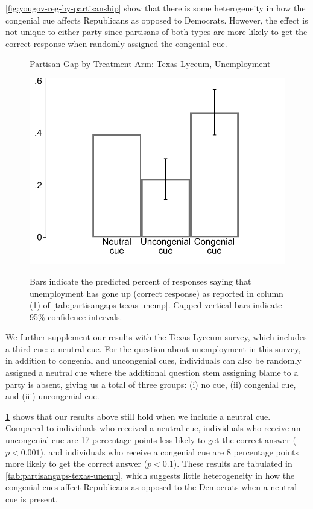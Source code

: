 \documentclass[12pt, letterpaper]{article}
\begin{document}
\cref{fig:yougov-reg-by-partisanship} show that there is some heterogeneity in how the congenial cue affects Republicans as opposed to Democrats. However, the effect is not unique to either party since partisans of both types are more likely to get the correct response when randomly assigned the congenial cue.

\begin{figure}[!t]
	\centering
	\caption{Partisan Gap by Treatment Arm: Texas Lyceum, Unemployment}
	\includegraphics[scale=.6]{../figs/texas-unemp-congenialcue.pdf}
	\label{fig:partisangaps-texas-unemp}
	\caption*{\footnotesize 
		Bars indicate the predicted percent of responses saying that unemployment has gone up (correct response) as reported in column (1) of \cref{tab:partisangaps-texas-unemp}.  
		Capped vertical bars indicate 95\% confidence intervals.
	}
\end{figure}

We further supplement our results with the Texas Lyceum survey, which includes a third cue: a neutral cue. For the question about unemployment in this survey, in addition to congenial and uncongenial cues, individuals can also be randomly assigned a neutral cue where the additional question stem assigning blame to a party is absent, giving us a total of three groups: (i) no cue, (ii) congenial cue, and (iii) uncongenial cue.

\cref{fig:partisangaps-texas-unemp} shows that our results above still hold when we include a neutral cue. Compared to individuals who received a neutral cue, individuals who receive an uncongenial cue are 17 percentage points less likely to get the correct answer ($p<0.001$), and individuals who receive a congenial cue are 8 percentage points more likely to get the correct answer ($p<0.1$). These results are tabulated in \cref{tab:partisangaps-texas-unemp}, which suggests little heterogeneity in how the congenial cues affect Republicans as opposed to the Democrats when a neutral cue is present.
\end{document}
